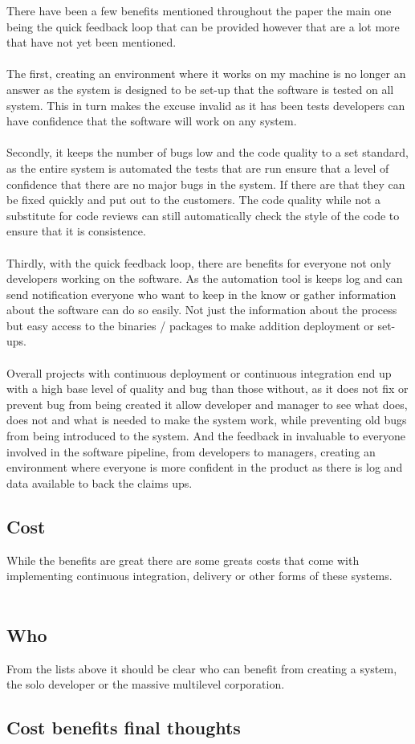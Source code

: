 There have been a few benefits mentioned throughout the paper the main one being the quick feedback loop that can be provided however that are a lot more that have not yet been mentioned.
\\\\
The first, creating an environment where it works on my machine is no longer an answer as the system is designed to be set-up that the software is tested on all system. This in turn makes the excuse invalid as it has been tests developers can have confidence that the software will work on any system.
\\\\
Secondly, it keeps the number of bugs low and the code quality to a set standard,  as the entire system is automated the tests that are run ensure that a level of confidence that there are no major bugs in the system. If there are that they can be fixed quickly and put out to the customers. The code quality while not a substitute for code reviews can still automatically check the style of the code to ensure that it is consistence. 
\\\\
Thirdly, with the quick feedback loop, there are benefits for everyone not only developers working on the software. As the automation tool is keeps log and can send notification everyone who want to keep in the know or gather information about the software can do so easily. Not just the information about the process but easy access to the binaries / packages to make addition deployment or set-ups.
\\\\
Overall projects with continuous deployment or continuous integration end up with a high base level of quality and bug than those without, as it does not fix or prevent bug from being created it allow developer and manager to see what does, does not and what is needed to make the system work, while preventing old bugs from being introduced to the system. And the feedback in invaluable to everyone involved in the software pipeline, from developers to managers, creating an environment where everyone is more confident in the product as there is log and data available to back the claims ups.


\subsection{Cost}

While the benefits are great there are some greats costs that come with implementing continuous integration, delivery or other forms of these systems.
\\\\


\subsection{Who}

From the lists above it should be clear who can benefit from creating a system, the solo developer or the massive multilevel corporation.

\subsection{Cost benefits final thoughts}